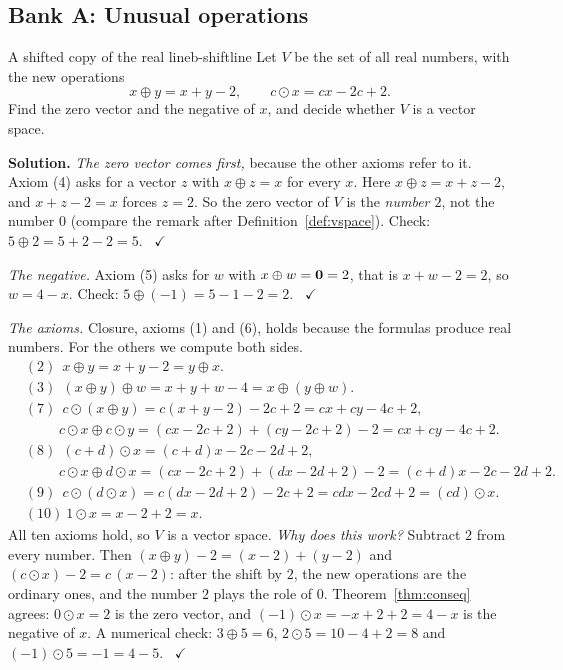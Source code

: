 \documentclass[11pt]{article}
\begin{document}
\subsection*{Bank A: Unusual operations}

\begin{exmp}{A shifted copy of the real line}{b-shiftline}
Let $V$ be the set of all real numbers, with the new operations
\[
x\oplus y=x+y-2,\qquad c\odot x=cx-2c+2.
\]
Find the zero vector and the negative of $x$, and decide whether $V$ is a vector space.

\textbf{Solution.} \emph{The zero vector comes first,} because the other axioms refer to it. Axiom (4) asks for a vector $z$ with $x\oplus z=x$ for every $x$. Here $x\oplus z=x+z-2$, and $x+z-2=x$ forces $z=2$. So the zero vector of $V$ is the \emph{number $2$}, not the number $0$ (compare the remark after Definition~\ref{def:vspace}). Check: $5\oplus2=5+2-2=5$. \ $\checkmark$

\emph{The negative.} Axiom (5) asks for $w$ with $x\oplus w=\mathbf{0}=2$, that is $x+w-2=2$, so $w=4-x$. Check: $5\oplus(-1)=5-1-2=2$. \ $\checkmark$

\emph{The axioms.} Closure, axioms (1) and (6), holds because the formulas produce real numbers. For the others we compute both sides.
\begin{align*}
&(2)\ \ x\oplus y=x+y-2=y\oplus x.\\
&(3)\ \ (x\oplus y)\oplus w=x+y+w-4=x\oplus(y\oplus w).\\
&(7)\ \ c\odot(x\oplus y)=c(x+y-2)-2c+2=cx+cy-4c+2,\\
&\qquad\ \ c\odot x\oplus c\odot y=(cx-2c+2)+(cy-2c+2)-2=cx+cy-4c+2.\\
&(8)\ \ (c+d)\odot x=(c+d)x-2c-2d+2,\\
&\qquad\ \ c\odot x\oplus d\odot x=(cx-2c+2)+(dx-2d+2)-2=(c+d)x-2c-2d+2.\\
&(9)\ \ c\odot(d\odot x)=c(dx-2d+2)-2c+2=cdx-2cd+2=(cd)\odot x.\\
&(10)\ 1\odot x=x-2+2=x.
\end{align*}
All ten axioms hold, so $V$ is a vector space. \emph{Why does this work?} Subtract $2$ from every number. Then $(x\oplus y)-2=(x-2)+(y-2)$ and $(c\odot x)-2=c\,(x-2)$: after the shift by $2$, the new operations are the ordinary ones, and the number $2$ plays the role of $0$. Theorem~\ref{thm:conseq} agrees: $0\odot x=2$ is the zero vector, and $(-1)\odot x=-x+2+2=4-x$ is the negative of $x$. A numerical check: $3\oplus5=6$, $2\odot5=10-4+2=8$ and $(-1)\odot5=-1=4-5$. \ $\checkmark$
\end{exmp}
\end{document}
